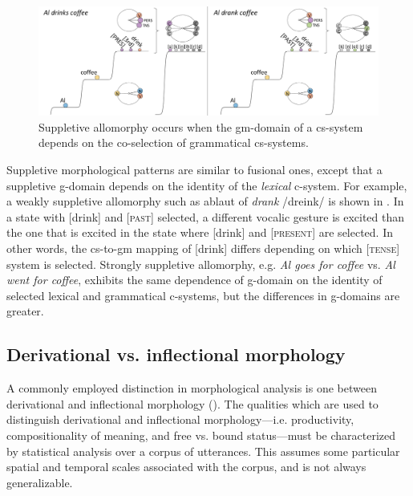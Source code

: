   
\begin{figure}
\includegraphics[width=\textwidth]{figures/Tilsen-img69.png}
\caption{Suppletive allomorphy occurs when the gm-domain of a cs-system depends on the co-selection of grammatical cs-systems.}
\label{fig:4:19}
\end{figure}
 

  Suppletive morphological patterns are similar to fusional ones, except that a suppletive g-domain depends on the identity of the \textit{lexical} c-system. For example, a weakly suppletive allomorphy such as ablaut of \textit{drank} /dreink/ is shown in {}. In a state with [drink] and [\textsc{past}] selected, a different vocalic gesture is excited than the one that is excited in the state where [drink] and [\textsc{present}] are selected. In other words, the cs-to-gm mapping of [drink] differs depending on which [\textsc{tense}] system is selected. Strongly suppletive allomorphy, e.g. \textit{Al goes for coffee} vs. \textit{Al went for coffee}, exhibits the same dependence of g-domain on the identity of selected lexical and grammatical c-systems, but the differences in g-domains are greater.

\subsection{Derivational vs. inflectional morphology}

A commonly employed distinction in morphological analysis is one between derivational and inflectional morphology (\citealt{BickelNichols2007,Booij1996,Dressler1989,HaspelmathSims2013}). The qualities which are used to distinguish derivational and inflectional morphology—i.e. productivity, compositionality of meaning, and free vs. bound status—must be characterized by statistical analysis over a corpus of utterances. This assumes some particular spatial and temporal scales associated with the corpus, and is not always generalizable. 

